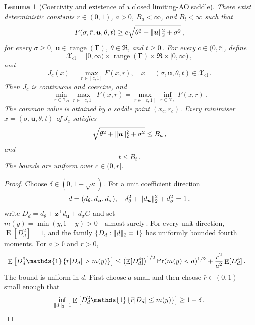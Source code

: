 \documentclass{article}
\makeatletter
\DeclareMathOperator{\expect}{E}
\newtheorem{lemma}{Lemma}
\theoremstyle{definition}
\newcommand{\vnorm}[1]{%
	\ensuremath{%
		\if@display
		\left\| #1 \right\|
		\else
		\| #1 \|
		\fi
	}%
}
\newcommand{\abs}[1]{%
	\ensuremath{%
		\if@display
		\left| #1 \right|
		\else
		\lvert #1 \rvert
		\fi
	}%
}
\newcommand*{\bb}{\boldsymbol}
\def\bu{\bb{u}}
\def\bz{\bb{z}}
\newcommand{\range}{\operatorname{range}}
\makeatother
\begin{document}
\begin{bibunit}
\begin{lemma}[Coercivity and existence of a closed limiting-AO saddle]
\label{lemma:limiting_AO_closed_saddle}
There exist deterministic constants $\bar r\in(0,1)$, $a>0$, $B_a<\infty$, and $B_t<\infty$
such that
\begin{equation}
\label{eq:limiting_AO_coercive_bound}
    F(\sigma,\bar r,\bu,\theta,t)
    \geq
    a
    \sqrt{\theta^2+\vnorm{\bu}_2^2+\sigma^2}\,,
\end{equation}
for every $\sigma\geq0$, $\bu\in\range(\bb\Gamma)$, $\theta\in\Re$, and $t\geq0\,.$
For every $c\in(0,\bar r]$, define
$$
    \mathcal X_{\mathrm{cl}}
    =
    [0,\infty)
    \times\range(\bb\Gamma)
    \times\Re
    \times[0,\infty)\,,
$$
and
$$
    J_c(x)
    =
    \underset{r\in[c,1]}{\max}F(x,r),
    \quad
    x=(\sigma,\bu,\theta,t)\in\mathcal X_{\mathrm{cl}}\,.
$$
Then $J_c$ is continuous and coercive, and 
\begin{equation}
\label{eq:limiting_AO_closed_minimax}
    \underset{x\in\mathcal X_{\mathrm{cl}}}{\min}
    \underset{r\in[c,1]}{\max}F(x,r)
    =
    \underset{r\in[c,1]}{\max}
    \underset{x\in\mathcal X_{\mathrm{cl}}}{\inf}F(x,r)\,.
\end{equation}
The common value is attained by a saddle point $(x_c,r_c)$. Every
minimiser $x=(\sigma,\bu,\theta,t)$ of $J_c$ satisfies
\begin{equation}
\label{eq:limiting_AO_Ba}
    \sqrt{\theta^2+\vnorm{\bu}_2^2+\sigma^2}
    \leq B_a\,,
\end{equation}
and
\begin{equation}
\label{eq:limiting_AO_Bt}
    t\leq B_t\,.
\end{equation}
The bounds are uniform over $c\in(0,\bar r]$.
\end{lemma}

\begin{proof}
Choose $\delta\in(0,1-\sqrt\kappa)\,.$
For a unit coefficient direction
$$
    d=(d_\theta,d_{\bu},d_\sigma),
    \quad
    d_\theta^2+\vnorm{d_{\bu}}_2^2+d_\sigma^2=1\,,
$$
write $D_d=d_\theta+\bz^\top d_{\bu}+d_\sigma G$
and set $m(y)=\min(y,1-y)>0 \quad\text{almost surely}\,.$
For every unit direction, $\expect[D_d^2]=1$, and the family
$\{D_d:\vnorm{d}_2=1\}$ has uniformly bounded fourth moments.
For $a>0$ and $r>0$,
$$
    \begin{aligned}
    &\expect\left[
        D_d^2\mathds{1}
        \left\{
            r\abs{D_d}>m(y)
        \right\}
    \right]\leq
    \left(\expect[D_d^4]\right)^{1/2}
    \Pr(m(y)<a)^{1/2}
    +
    \frac{r^2}{a^2}\expect[D_d^4]\,.
    \end{aligned}
$$
The bound is uniform in $d$. First choose $a$ small and then choose
$\bar r\in(0,1)$ small enough that
\begin{equation}
\label{eq:limiting_AO_dual_mass}
    \underset{\vnorm{d}_2=1}{\inf}
    \expect\left[
        D_d^2\mathds{1}
        \left\{
            \bar r\abs{D_d}\leq m(y)
        \right\}
    \right]
    \geq1-\delta\,.
\end{equation}


\end{proof}
\end{bibunit}
\end{document}
